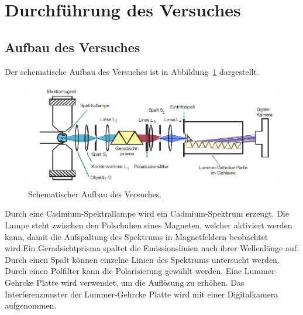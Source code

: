 \section{Durchführung des Versuches}
\label{sec:Durchführung}

\subsection{Aufbau des Versuches}
\label{subsec:aufbau}
Der schematische Aufbau des Versuches ist in Abbildung~\ref{fig:aufbau}
dargestellt.
\begin{figure}[H]
  \centering
  \includegraphics[scale=0.4]{pictures/aufbau.png}
  \caption{Schematischer Aufbau des Versuches. \cite{Versuchsbeschreibung}}
  \label{fig:aufbau}
\end{figure}
\noindent
Durch eine Cadmium-Spektrallampe wird ein Cadmium-Spektrum erzeugt. Die
Lampe steht zwischen den Polschuhen eines Magneten, welcher aktiviert
werden kann, damit die Aufspaltung des Spektrums in Magnetfeldern beobachtet
wird.Ein Geradsichtprisma spaltet die Emissionslinien nach ihrer
Wellenlänge auf. Durch einen Spalt können einzelne Linien des Spektrums
untersucht werden. Durch einen Polfilter kann die Polarisierung gewählt
werden. Eine Lummer-Gehrcke Platte wird verwendet, um die Auflösung zu
erhöhen. Das Interferenzmuster der Lummer-Gehrcke Platte wird mit einer
Digitalkamera aufgenommen.

